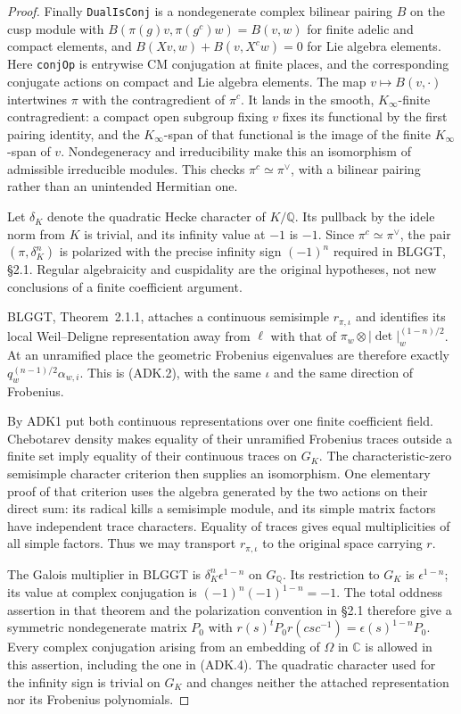 \documentclass[11pt,a4paper]{article}
\numberwithin{equation}{section}
\theoremstyle{remark}\newtheorem{remark}[theorem]{Remark}
\begin{document}
\begin{proof}
Finally \texttt{Dual\allowbreak Is\allowbreak Conj} is a nondegenerate complex bilinear
pairing $B$ on the cusp module with
$B(\pi(g)v,\pi(g^c)w)=B(v,\allowbreak{} w)$ for finite adelic and compact
elements, and
$B(Xv,\allowbreak{} w)+B(v,\allowbreak{} X^cw)=0$ for Lie algebra elements.
Here \texttt{conj\allowbreak Op} is entrywise CM conjugation at finite places,
and the corresponding conjugate actions on compact and Lie algebra
elements.  The map $v\mapsto B(v,\cdot)$ intertwines $\pi$ with
the contragredient of $\pi^c$.  It lands in the smooth,
$K_\infty$-finite contragredient: a compact open subgroup fixing
$v$ fixes its functional by the first pairing identity, and the
$K_\infty$-span of that functional is the image of the finite
$K_\infty$-span of $v$.  Nondegeneracy and irreducibility make this
an isomorphism of admissible irreducible modules.  This checks
$\pi^c\simeq\pi^\vee$, with a bilinear pairing rather than an
unintended Hermitian one.

Let $\delta_K$ denote the quadratic Hecke character of
$K/\mathbb Q$.  Its pullback by the idele norm from $K$ is trivial,
and its infinity value at $-1$ is $-1$.  Since
$\pi^c\simeq\pi^\vee$, the pair
$(\pi,\delta_K^n)$ is polarized with the precise infinity sign
$(-1)^n$ required in BLGGT, \S2.1.  Regular algebraicity and
cuspidality are the original hypotheses, not new conclusions of a
finite coefficient argument.

BLGGT, Theorem~2.1.1, attaches a continuous semisimple
$r_{\pi,\iota}$ and identifies its local Weil--Deligne representation
away from $\ell$ with that of
$\pi_w\otimes|\det|_w^{(1-n)/2}$.  At an unramified place the
geometric Frobenius eigenvalues are therefore exactly
$q_w^{(n-1)/2}\alpha_{w,\allowbreak{} i}$.  This is (ADK.2), with the same
$\iota$ and the same direction of Frobenius.

By ADK1 put both continuous representations over one finite
coefficient field.  Chebotarev density makes equality of their
unramified Frobenius traces outside a finite set imply equality of
their continuous traces on $G_K$.  The characteristic-zero
semisimple character criterion then supplies an isomorphism.  One
elementary proof of that criterion uses the algebra generated by the
two actions on their direct sum: its radical kills a semisimple
module, and its simple matrix factors have independent trace
characters.  Equality of traces gives equal multiplicities of all
simple factors.  Thus we may transport $r_{\pi,\iota}$ to the
original space carrying $r$.

The Galois multiplier in BLGGT is
$\delta_K^n\epsilon^{1-n}$ on $G_{\mathbb Q}$.  Its restriction to
$G_K$ is $\epsilon^{1-n}$; its value at complex conjugation is
$(-1)^n(-1)^{1-n}=-1$.  The total oddness assertion in that theorem
and the polarization convention in \S2.1 therefore give a symmetric
nondegenerate matrix $P_0$ with
$r(s)^tP_0r(csc^{-1})=\epsilon(s)^{1-n}P_0$.
Every complex conjugation arising from an embedding of $\Omega$ in
$\mathbb C$ is allowed in this assertion, including the one in
(ADK.4).  The quadratic character used for the infinity sign is
trivial on $G_K$ and changes neither the attached representation nor
its Frobenius polynomials.
\end{proof}
\end{document}
